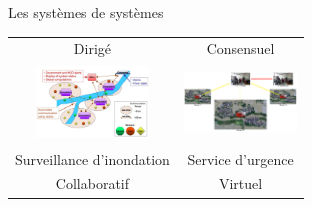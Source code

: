 

\begin{frame}{Les systèmes de systèmes}
\centering 
\begin{tabular}{cc}
Dirigé & Consensuel \\
\includegraphics[width=3cm, height=2cm]{imgs/fms.jpeg} &
\includegraphics[width=3cm, height=2cm]{imgs/fig_overview_conf1.pdf}\\
Surveillance d'inondation \vspace{0.2cm}& Service d'urgence\vspace{0.2cm}\\
Collaboratif & Virtuel \\ 

\end{tabular}
\end{frame}
